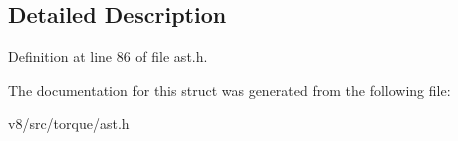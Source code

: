 \subsection{Detailed Description}


Definition at line 86 of file ast.\+h.



The documentation for this struct was generated from the following file\+:\begin{DoxyCompactItemize}
\item 
v8/src/torque/ast.\+h\end{DoxyCompactItemize}
